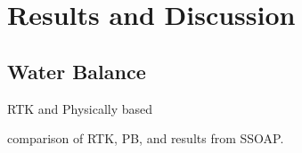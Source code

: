 \chapter{Results and Discussion}

\section{Water Balance}

RTK and Physically based

comparison of RTK, PB, and results from SSOAP.



